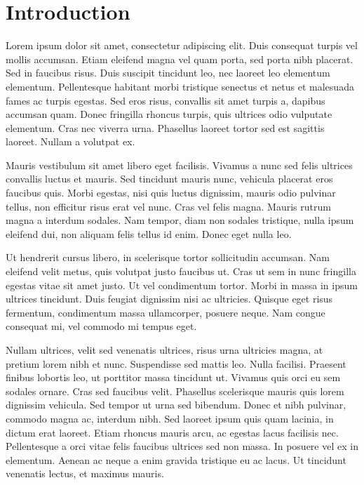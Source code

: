 \documentclass[aps,pre,twocolumn,letterpaper,floatfix,showpacs]{revtex4}
\begin{document}
\section{Introduction}


Lorem ipsum dolor sit amet, consectetur adipiscing elit. Duis consequat turpis vel mollis accumsan. Etiam eleifend magna vel quam porta, sed porta nibh placerat. Sed in faucibus risus. Duis suscipit tincidunt leo, nec laoreet leo elementum elementum. Pellentesque habitant morbi tristique senectus et netus et malesuada fames ac turpis egestas. Sed eros risus, convallis sit amet turpis a, dapibus accumsan quam. Donec fringilla rhoncus turpis, quis ultrices odio vulputate elementum. Cras nec viverra urna. Phasellus laoreet tortor sed est sagittis laoreet. Nullam a volutpat ex.

Mauris vestibulum sit amet libero eget facilisis. Vivamus a nunc sed felis ultrices convallis luctus et mauris. Sed tincidunt mauris nunc, vehicula placerat eros faucibus quis. Morbi egestas, nisi quis luctus dignissim, mauris odio pulvinar tellus, non efficitur risus erat vel nunc. Cras vel felis magna. Mauris rutrum magna a interdum sodales. Nam tempor, diam non sodales tristique, nulla ipsum eleifend dui, non aliquam felis tellus id enim. Donec eget nulla leo.

Ut hendrerit cursus libero, in scelerisque tortor sollicitudin accumsan. Nam eleifend velit metus, quis volutpat justo faucibus ut. Cras ut sem in nunc fringilla egestas vitae sit amet justo. Ut vel condimentum tortor. Morbi in massa in ipsum ultrices tincidunt. Duis feugiat dignissim nisi ac ultricies. Quisque eget risus fermentum, condimentum massa ullamcorper, posuere neque. Nam congue consequat mi, vel commodo mi tempus eget.

Nullam ultrices, velit sed venenatis ultrices, risus urna ultricies magna, at pretium lorem nibh et nunc. Suspendisse sed mattis leo. Nulla facilisi. Praesent finibus lobortis leo, ut porttitor massa tincidunt ut. Vivamus quis orci eu sem sodales ornare. Cras sed faucibus velit. Phasellus scelerisque mauris quis lorem dignissim vehicula. Sed tempor ut urna sed bibendum. Donec et nibh pulvinar, commodo magna ac, interdum nibh. Sed laoreet ipsum quis quam lacinia, in dictum erat laoreet. Etiam rhoncus mauris arcu, ac egestas lacus facilisis nec. Pellentesque a orci vitae felis faucibus ultrices sed non massa. In posuere vel ex in elementum. Aenean ac neque a enim gravida tristique eu ac lacus. Ut tincidunt venenatis lectus, et maximus mauris.
\end{document}
